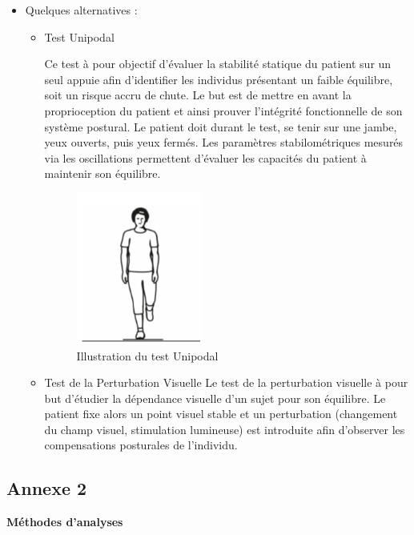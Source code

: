 \begin{itemize}
    \item Quelques alternatives :
    \begin{itemize}
        \item Test Unipodal 
        
        Ce test à pour objectif d’évaluer la stabilité statique du patient sur un seul appuie  afin d’identifier les individus présentant un faible équilibre, soit un risque accru de chute. Le but est de mettre en avant la proprioception  du patient et ainsi prouver l’intégrité fonctionnelle de son système postural. Le patient doit durant le test, se tenir sur une jambe, yeux ouverts, puis yeux fermés. Les paramètres stabilométriques mesurés via les oscillations permettent d’évaluer les capacités du patient à maintenir son équilibre.

\begin{figure}[H]
    \centering
    \includegraphics[height=5cm]{images/Exam_cli/Unipodal.png}
    \caption{Illustration du test Unipodal} 
    \label{fig:test_de_Unipodal}
\end{figure}
        
        \item   Test de la Perturbation Visuelle 
        Le test de la perturbation visuelle à pour but d’étudier la dépendance visuelle d’un sujet pour son équilibre. Le patient fixe alors un point visuel stable et un perturbation (changement du champ visuel, stimulation lumineuse) est introduite afin d'observer les compensations posturales de l’individu. 
    \end{itemize}
\end{itemize}



\newpage
\subsection{Annexe 2}


\textbf{Méthodes d’analyses}\\ 



